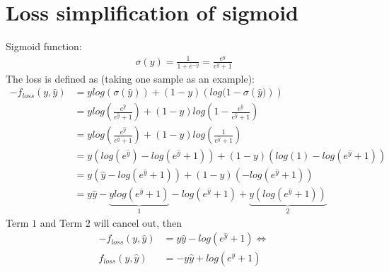 \documentclass[a4paper]{article}
\begin{document}
\section{Loss simplification of sigmoid}
Sigmoid function:
\begin{align}
	\sigma(y) = \frac{1}{1+e^{-y}} = \frac{e^y}{e^{y}+1} 
\end{align}
The loss is defined as (taking one sample as an example):
\begin{align}
-f_{loss}(y, \hat{y})&=ylog(\sigma(\hat{y}))+(1-y)\left( log(1-\sigma\left( \hat{y}) \right) \right)  \\
&=ylog(\frac{e^{\hat{y}}}{e^{\hat{y}}+1})+(1-y)log(1-\frac{e^{\hat{y}}}{e^{\hat{y}}+1})  \\
&=ylog(\frac{e^{\hat{y}}}{e^{\hat{y}}+1})+(1-y)log(\frac{1}{e^{\hat{y}}+1})  \\
&=y\left( log\left(e^{\hat{y}}\right)-log\left({e^{\hat{y}}+1}\right)\right)+(1-y)\left(log(1)-log(e^{\hat{y}}+1)\right)  \\
&=y\left(\hat{y}-log\left({e^{\hat{y}}+1}\right)\right)+(1-y)\left(-log(e^{\hat{y}}+1)\right) \\
&=y\hat{y}-\underbrace{ylog\left({e^{\hat{y}}+1}\right)}_{1}-log(e^{\hat{y}}+1)+\underbrace{y\left(log(e^{\hat{y}}+1)\right)}_{2}
\end{align}
Term $1$ and Term $2$ will cancel out, then
\begin{align}
	-f_{loss}(y, \hat{y})&=y\hat{y}-log(e^{\hat{y}}+1) \Leftrightarrow \\
	f_{loss}(y, \hat{y})&=-y\hat{y}+log(e^{\hat{y}}+1) 
\end{align}
\end{document}
